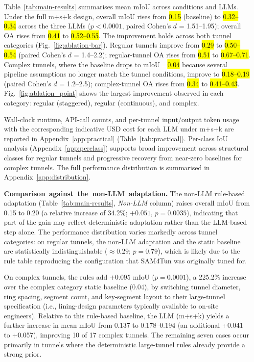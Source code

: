 \documentclass[a4paper,fleqn]{cas-dc}
\begin{document}
{Table~\ref{tab:main-results} summarises mean mIoU across conditions and LLMs. Under the full m+s+k design, overall mIoU rises from \hl{0.15} (baseline) to \hl{0.32--0.34} across the three LLMs ($p < 0.0001$, paired Cohen's \mbox{$d$} = 1.51--1.95); overall OA rises from \hl{0.41} to \hl{0.52--0.55}. The improvement holds across both tunnel categories (Fig.~\ref{fig:ablation-bar}). Regular tunnels improve from \hl{0.29} to \hl{0.50--0.54} (paired Cohen's \mbox{$d$} = 1.4--2.2); regular-tunnel OA rises from \hl{0.51} to \hl{0.67--0.71}. Complex tunnels, where the baseline drops to mIoU\,=\,\hl{0.04} because several pipeline assumptions no longer match the tunnel conditions, improve to \hl{0.18--0.19} (paired Cohen's \mbox{$d$} = 1.2--2.5); complex-tunnel OA rises from \hl{0.34} to \hl{0.41--0.43}. Fig.~\ref{fig:ablation_point} shows the largest improvement observed in each category: regular (staggered), regular (continuous), and complex.

Wall-clock runtime, API-call counts, and per-tunnel input/output token usage with the corresponding indicative USD cost for each LLM under m+s+k are reported in Appendix~\ref{app:practical} (Table~\ref{tab:practical}). Per-class IoU analysis (Appendix~\ref{app:perclass}) supports broad improvement across structural classes for regular tunnels and progressive recovery from near-zero baselines for complex tunnels. The full performance distribution is summarised in Appendix~\ref{app:distribution}. 



\mbox{\textbf{Comparison against the non-LLM adaptation.}} The non-LLM rule-based adaptation (Table~\mbox{\ref{tab:main-results}}, \mbox{\emph{Non-LLM}} column) raises overall mIoU from 0.15 to 0.20 (a relative increase of 34.2\%; $+0.051$, $p = 0.0035$), indicating that part of the gain may reflect deterministic adaptation rather than the LLM-based step alone. The performance distribution varies markedly across tunnel categories: on regular tunnels, the non-LLM adaptation and the static baseline are statistically indistinguishable ($\approx 0.29$; $p = 0.79$), which is likely due to the rule table reproducing the configuration that SAM4Tun was originally tuned for.

On complex tunnels, the rules add $+0.095$ mIoU ($p = 0.0001$), a 225.2\% increase over the complex category static baseline (0.04), by switching tunnel diameter, ring spacing, segment count, and key-segment layout to their large-tunnel specification (i.e., lining-design parameters typically available to on-site engineers). Relative to this rule-based baseline, the LLM (m+s+k) yields a further increase in mean mIoU from 0.137 to 0.178--0.194 (an additional +0.041 to +0.057), improving 10 of 17 complex tunnels. The remaining seven cases occur primarily in tunnels where the deterministic large-tunnel rules already provide a strong prior.

}
\end{document}
